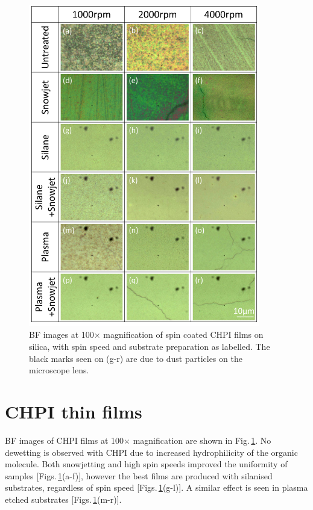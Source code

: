 \begin{figure}[h!] 
\centering    
\includegraphics[width=0.9\textwidth]{Fig5}
\caption{BF images at 100$\times$ magnification of spin coated CHPI films on silica, with spin speed and substrate preparation as labelled. The black marks seen on (g-r) are due to dust particles on the microscope lens.}
\label{4Fig5}
\end{figure}
\section{CHPI thin films}
BF images of CHPI films at 100$\times$ magnification are shown in Fig.\,\ref{4Fig5}. No dewetting is observed with CHPI due to increased hydrophilicity of the organic molecule. Both snowjetting and high spin speeds improved the uniformity of samples [Figs.\,\ref{4Fig5}(a-f)], however the best films are produced with silanised substrates, regardless of spin speed [Figs.\,\ref{4Fig5}(g-l)]. A similar effect is seen in plasma etched substrates [Figs.\,\ref{4Fig5}(m-r)].


